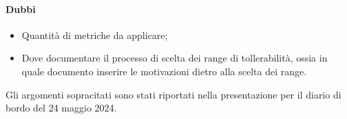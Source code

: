 \paragraph{Dubbi}
\begin{itemize}
	\item Quantità di metriche da applicare;
	\item Dove documentare il processo di scelta dei range di tollerabilità, ossia in quale documento inserire le motivazioni dietro alla scelta dei range.
\end{itemize}

\par Gli argomenti sopracitati sono stati riportati nella presentazione per il diario di bordo del 24 maggio 2024.
